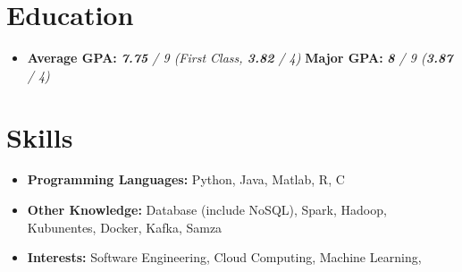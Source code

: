 \documentclass{resume}
\begin{document}



\section{Education}
\begin{itemize}[parsep=0.5ex]
  \item \textbf{Average GPA:} \textit{\textbf{7.75} / 9 (First Class, \textbf{3.82} / 4)} \hspace{0.6cm} \textbf{Major GPA:} \textit{\textbf{8} / 9 (\textbf{3.87} / 4)}
\end{itemize}

\section{Skills}
\begin{itemize}[parsep=0.5ex]
  \item \textbf{Programming Languages:} Python, Java, Matlab, R, C
  \item \textbf{Other Knowledge:} Database (include NoSQL), Spark, Hadoop, Kubunentes, Docker, Kafka, Samza
  \item \textbf{Interests:} Software Engineering, Cloud Computing, Machine Learning, 
\end{itemize}
\end{document}
